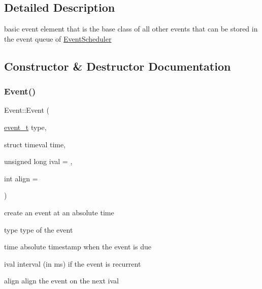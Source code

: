 \subsection{Detailed Description}
basic event element that is the base class of all other events that can be stored in the event queue of \hyperlink{classEventScheduler}{Event\+Scheduler} 

\subsection{Constructor \& Destructor Documentation}
\mbox{\label{classEvent_acd3f54caeb58e6375e51a044c0ee2616}} 
\subsubsection{\texorpdfstring{Event()}{Event()}\hspace{0.1cm}{\footnotesize\ttfamily [1/3]}}
{\footnotesize\ttfamily Event\+::\+Event (\begin{DoxyParamCaption}\item[{\hyperlink{Event_8h_a2fb9b58e4e5f14f40af8b4a1425841f8}{event\+\_\+t}}]{type,  }\item[{struct timeval}]{time,  }\item[{unsigned long}]{ival = {},  }\item[{int}]{align = {} }\end{DoxyParamCaption})}



create an event at an absolute time 

\begin{DoxyItemize}
\item {\ttfamily type} type of the event \item {\ttfamily time} absolute timestamp when the event is due \item {\ttfamily ival} interval (in ms) if the event is recurrent \item {\ttfamily align} align the event on the next ival \end{DoxyItemize}
\mbox{\label{classEvent_a0b28a5ecf2af747c56b9cdcd2e26642b}} 
